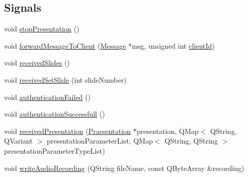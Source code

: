 \subsection*{Signals}
\begin{DoxyCompactItemize}
\item 
void \hyperlink{class_server_appl_1_1_master_a4f91b9f8a0c3105a86c283ec9f9c5d31}{stop\+Presentation} ()
\item 
void \hyperlink{class_server_appl_1_1_master_a711258f635c3cd79d8328c9b1e0f56c3}{forward\+Message\+To\+Client} (\hyperlink{class_message}{Message} $\ast$msg, unsigned int \hyperlink{class_server_appl_1_1_unspecified_client_a9a3cf2d070f19fb2bfd7d544053955b0}{client\+Id})
\item 
void \hyperlink{class_server_appl_1_1_master_a7f1f6b0954971ce4a4cac720030433ec}{received\+Slides} ()
\item 
void \hyperlink{class_server_appl_1_1_master_a711fc68e3ffbd43fac7c72fe6b5c6eab}{received\+Set\+Slide} (int slide\+Number)
\item 
void \hyperlink{class_server_appl_1_1_master_a24fbea340517fe8b4e94e3634870f7e4}{authentication\+Failed} ()
\item 
void \hyperlink{class_server_appl_1_1_master_abb70fac43d3572f1895b1b69e55b9cc5}{authentication\+Successfull} ()
\item 
void \hyperlink{class_server_appl_1_1_master_a444769874f653f5bb3c67698327ffcd9}{received\+Presentation} (\hyperlink{class_praesentation}{Praesentation} $\ast$presentation, Q\+Map$<$ Q\+String, Q\+Variant $>$ presentation\+Parameter\+List, Q\+Map$<$ Q\+String, Q\+String $>$ presentation\+Parameter\+Type\+List)
\item 
void \hyperlink{class_server_appl_1_1_master_abae549f91598d2954857cac0ff445d7f}{write\+Audio\+Recording} (Q\+String file\+Name, const Q\+Byte\+Array \&recording)
\end{DoxyCompactItemize}
